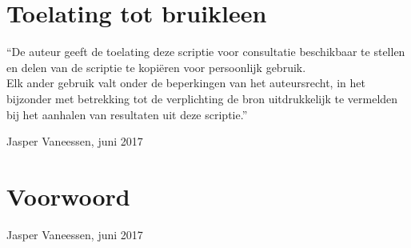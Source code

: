 
\chapter{Toelating tot bruikleen}

\vspace{1.5cm}

\noindent
``De auteur geeft de toelating deze scriptie voor consultatie beschikbaar
te stellen en delen van de scriptie te kopi\"eren voor persoonlijk
gebruik.\\
Elk ander gebruik valt onder de beperkingen van het auteursrecht,
in het bijzonder met betrekking tot de verplichting de bron uitdrukkelijk
te vermelden bij het aanhalen van resultaten uit deze scriptie.''

\addvspace{4cm}

\noindent Jasper Vaneessen, juni 2017

\chapter{Voorwoord}

\begin{slshape}
\renewcommand{\baselinestretch}{1.2}
\small\normalsize


\addvspace{4cm}

\noindent Jasper Vaneessen, juni 2017
\end{slshape}

